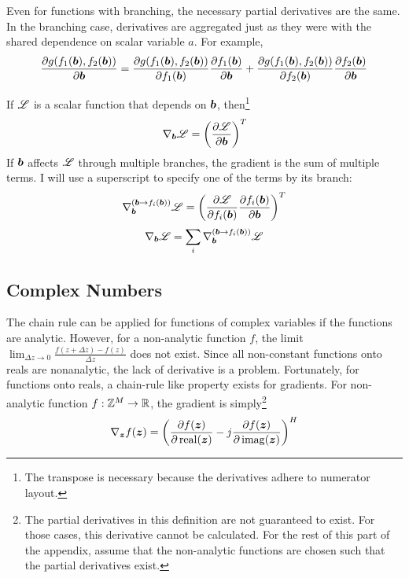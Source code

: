 \begin{appendices}
Even for functions with branching, the necessary partial derivatives are the same. In the branching case, derivatives are aggregated just as they were with the shared dependence on scalar variable $a$. For example,
\begin{equation}
\frac{\partial g(f_1(\bm{b}),f_2(\bm{b}))}{\partial \bm{b}} = \frac{\partial g(f_1(\bm{b}),f_2(\bm{b}))}{\partial f_1(\bm{b})}\frac{\partial f_1(\bm{b})}{\partial \bm{b}} + \frac{\partial g(f_1(\bm{b}),f_2(\bm{b}))}{\partial f_2(\bm{b})}\frac{\partial f_2(\bm{b})}{\partial \bm{b}} 
\end{equation}

If $\mathscr{L}$ is a scalar function that depends on $\bm{b}$, then\footnote{The transpose is necessary because the derivatives adhere to numerator layout.}
\begin{equation}
\nabla_{\bm{b}} \mathscr{L} = \left(\frac{\partial \mathscr{L}}{\partial \bm{b}}\right)^T
\end{equation}
If $\bm{b}$ affects $\mathscr{L}$ through multiple branches, the gradient is the sum of multiple terms. I will use a superscript to specify one of the terms by its branch:
\begin{equation}
\nabla^{(\bm{b} \rightarrow f_i(\bm{b}))}_{\bm{b}} \mathscr{L} = \left(\frac{\partial \mathscr{L}}{\partial f_i(\bm{b})}\frac{\partial f_i(\bm{b})}{\partial \bm{b}}\right)^T
\end{equation}
\begin{equation}
\nabla_{\bm{b}} \mathscr{L} = \sum_i \nabla^{(\bm{b} \rightarrow f_i(\bm{b}))}_{\bm{b}} \mathscr{L}
\end{equation}

\subsection{Complex Numbers}
The chain rule can be applied for functions of complex variables if the functions are analytic. However, for a non-analytic function $f$, the limit $\lim_{\Delta z \rightarrow 0} \frac{f(z + \Delta z) - f(z)}{\Delta z}$ does not exist. Since all non-constant functions onto reals are nonanalytic, the lack of derivative is a problem. Fortunately, for functions onto reals, a chain-rule like property exists for gradients. For non-analytic function $f: \mathbb{Z}^M \rightarrow \mathbb{R}$, the gradient is simply\footnote{The partial derivatives in this definition are not guaranteed to exist. For those cases, this derivative cannot be calculated. For the rest of this part of the appendix, assume that the non-analytic functions are chosen such that the partial derivatives exist.}
\begin{equation} \label{equation:Gradient Definition}
\nabla_{\bm{z}} f(\bm{z}) = \left(\frac{\partial f(\bm{z})}{\partial \operatorname{real}(\bm{z})} - j\frac{\partial f(\bm{z})}{\partial \operatorname{imag}(\bm{z})}\right)^H
\end{equation}


\end{appendices}
